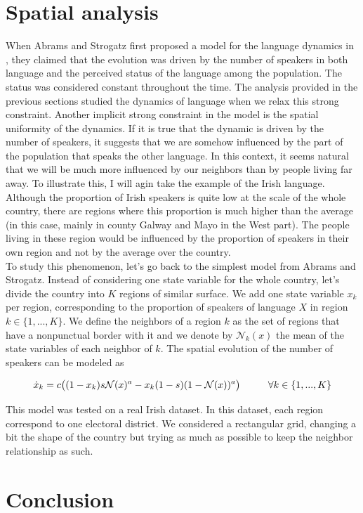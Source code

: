 \documentclass{article}
\begin{document}
\section{Spatial analysis}
\label{sec:spatial}
When Abrams and Strogatz first proposed a model for the language dynamics in \cite{death}, they claimed that the evolution was driven by the number of speakers in both language and the perceived status of the language among the population.
The status was considered constant throughout the time.
The analysis provided in the previous sections studied the dynamics of language when we relax this strong constraint.
Another implicit strong constraint in the model is the spatial uniformity of the dynamics.
If it is true that the dynamic is driven by the number of speakers, it suggests that we are somehow influenced by the part of the population that speaks the other language.
In this context, it seems natural that we will be much more influenced by our neighbors than by people living far away.
To illustrate this, I will agin take the example of the Irish language.
Although the proportion of Irish speakers is quite low at the scale of the whole country, there are regions where this proportion is much higher than the average (in this case, mainly in county Galway and Mayo in the West part).
The people living in these region would be influenced by the proportion of speakers in their own region and not by the average over the country.\\
To study this phenomenon, let's go back to the simplest model from Abrams and Strogatz. Instead of considering one state variable for the whole country, let's divide the country into $K$ regions of similar surface.
We add one state variable $x_k$ per region, corresponding to the proportion of speakers of language $X$ in region $k \in \{ 1, ..., K\}$.
We define the neighbors of a region $k$ as the set of regions that have a nonpunctual border with it and we denote by $\mathcal{N}_k(x)$ the mean of the state variables of each neighbor of $k$.
The spatial evolution of the number of speakers can be modeled as

\begin{equation}
\dot{x}_k = c\big( (1-x_k)s\mathcal{N}(x)^a - x_k(1-s)(1-\mathcal{N}(x))^a \big) \hspace{1cm} \forall k \in \{1,...,K\}
\end{equation}

This model was tested on a real Irish dataset.
In this dataset, each region correspond to one electoral district.
We considered a rectangular grid, changing a bit the shape of the country but trying as much as possible to keep the neighbor relationship as such.



\section{Conclusion}
\label{sec:conclusion}





\end{document}
